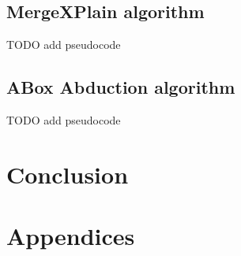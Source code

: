 \documentclass[12pt,a4paper]{article}
\begin{document}
\subsection{MergeXPlain algorithm}

TODO add pseudocode

\subsection{ABox Abduction algorithm}

TODO add pseudocode

\pagebreak
\section*{Conclusion}

\pagebreak
{}



\pagebreak
\section*{Appendices}
\end{document}
